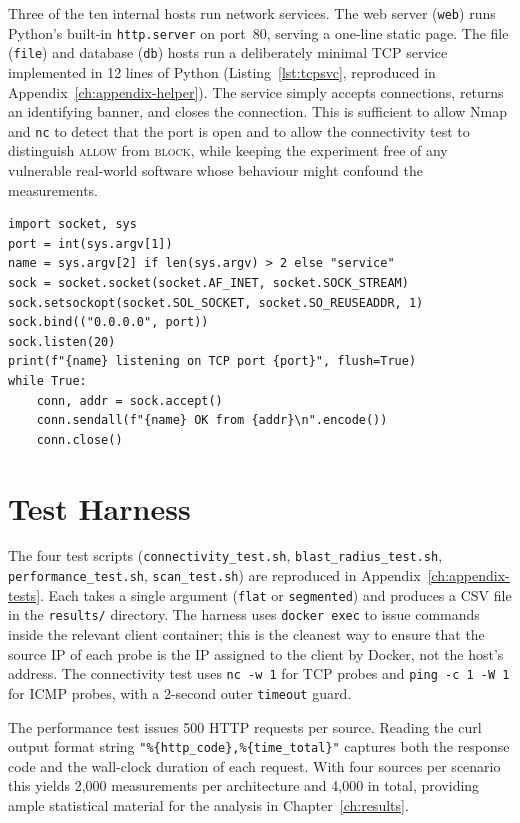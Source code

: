Three of the ten internal hosts run network services. The web server (\texttt{web}) runs Python's built-in \texttt{http.server} on port~80, serving a one-line static page. The file (\texttt{file}) and database (\texttt{db}) hosts run a deliberately minimal TCP service implemented in 12 lines of Python (Listing~\ref{lst:tcpsvc}, reproduced in Appendix~\ref{ch:appendix-helper}). The service simply accepts connections, returns an identifying banner, and closes the connection. This is sufficient to allow Nmap and \texttt{nc} to detect that the port is open and to allow the connectivity test to distinguish \textsc{allow} from \textsc{block}, while keeping the experiment free of any vulnerable real-world software whose behaviour might confound the measurements.

\begin{lstlisting}[style=pystyle, caption={Minimal TCP service (\texttt{tcp\_service.py})}, label=lst:tcpsvc]
import socket, sys
port = int(sys.argv[1])
name = sys.argv[2] if len(sys.argv) > 2 else "service"
sock = socket.socket(socket.AF_INET, socket.SOCK_STREAM)
sock.setsockopt(socket.SOL_SOCKET, socket.SO_REUSEADDR, 1)
sock.bind(("0.0.0.0", port))
sock.listen(20)
print(f"{name} listening on TCP port {port}", flush=True)
while True:
    conn, addr = sock.accept()
    conn.sendall(f"{name} OK from {addr}\n".encode())
    conn.close()
\end{lstlisting}

\section{Test Harness}

The four test scripts (\texttt{connectivity\_test.sh}, \texttt{blast\_radius\_test.sh}, \texttt{performance\_test.sh}, \texttt{scan\_test.sh}) are reproduced in Appendix~\ref{ch:appendix-tests}. Each takes a single argument (\texttt{flat} or \texttt{segmented}) and produces a CSV file in the \texttt{results/} directory. The harness uses \texttt{docker exec} to issue commands inside the relevant client container; this is the cleanest way to ensure that the source IP of each probe is the IP assigned to the client by Docker, not the host's address. The connectivity test uses \texttt{nc -w 1} for TCP probes and \texttt{ping -c 1 -W 1} for ICMP probes, with a 2-second outer \texttt{timeout} guard.

The performance test issues 500 HTTP requests per source. Reading the curl output format string \texttt{"\%\{http\_code\},\%\{time\_total\}"} captures both the response code and the wall-clock duration of each request. With four sources per scenario this yields 2{,}000 measurements per architecture and 4{,}000 in total, providing ample statistical material for the analysis in Chapter~\ref{ch:results}.

